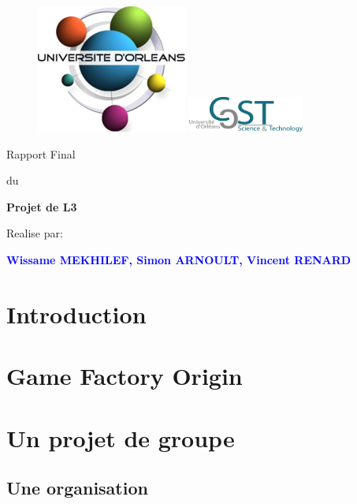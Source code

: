 \documentclass[french,12pt]{article}
\begin{document}
\thispagestyle{empty}
%
\begin{figure}[H]
\includegraphics[width=0.2\linewidth]{logo_univ.png}
\hfill
\includegraphics[width=1.5in]{logo_ufr.png}
\end{figure}
\vspace{2cm}
%
\begin{center}
{\Huge Rapport Final}
\par\vspace{0.4cm}
{\Large du}
\par\vspace{0.4cm}
{\Huge\bf Projet de L3}
\par\vspace{1.6cm}
{\Huge       Realise par:}
\par\vspace{0.3cm}
{\Huge\bf \textcolor{blue}{Wissame MEKHILEF, Simon ARNOULT, Vincent RENARD}}
\end{center}
\newpage
\tableofcontents
\newpage


\section{Introduction}
\subsection{}

\section{Game Factory Origin}
\subsection{}

\section{Un projet de groupe}
\subsection{Une organisation}
\end{document}
